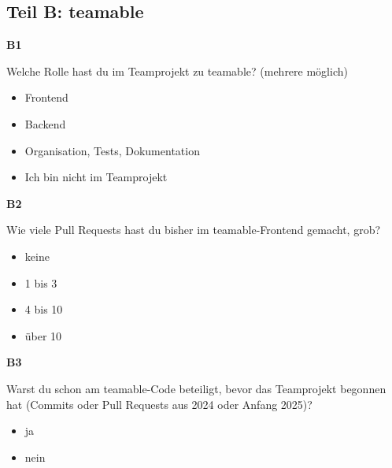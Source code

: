 \medskip

\subsection*{Teil B: teamable}

\noindent\begin{minipage}{\linewidth}
\textbf{B1}\par
Welche Rolle hast du im Teamprojekt zu teamable? (mehrere möglich)

\begin{itemize}[nosep,leftmargin=2.4em]
\item[\kreuz] Frontend
\item[\kreuz] Backend
\item[\kreuz] Organisation, Tests, Dokumentation
\item[\kreuz] Ich bin nicht im Teamprojekt
\end{itemize}
\end{minipage}

\medskip

\noindent\begin{minipage}{\linewidth}
\textbf{B2}\par
Wie viele Pull Requests hast du bisher im teamable-Frontend gemacht, grob?

\begin{itemize}[nosep,leftmargin=2.4em]
\item[\kreuz] keine
\item[\kreuz] 1 bis 3
\item[\kreuz] 4 bis 10
\item[\kreuz] über 10
\end{itemize}
\end{minipage}

\medskip

\noindent\begin{minipage}{\linewidth}
\textbf{B3}\par
Warst du schon am teamable-Code beteiligt, bevor das Teamprojekt begonnen hat (Commits oder Pull Requests aus 2024 oder Anfang 2025)?

\begin{itemize}[nosep,leftmargin=2.4em]
\item[\kreuz] ja
\item[\kreuz] nein
\end{itemize}
\end{minipage}

\medskip


